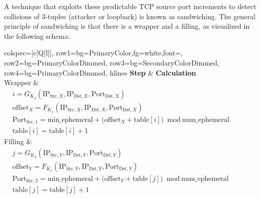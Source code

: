 \documentclass[twocolumn]{report}
\begin{document}
A technique that exploits these predictable TCP source port increments to detect collisions of 3-tuples (attacker or loopback) is known as \alert{sandwiching}. The general principle of sandwiching is that there is a \alert{wrapper} and a \alert{filling}, as visualized in the following schema:

\begin{center}
	\begin{adjustbox}{max width=0.95\columnwidth}
		\begin{tblr}{
			colspec={|c|Q[l]|},
			row{1}={bg=PrimaryColor,fg=white,font=\bfseries},
			row{2}={bg=PrimaryColorDimmed},
			row{3}={bg=SecondaryColorDimmed},
			row{4}={bg=PrimaryColorDimmed},
			hlines
			}
			\textbf{Step} & \textbf{Calculation} \\

			Wrapper       &
			\(
			\begin{aligned}
				 & i = G_{K_2}(\text{IP}_{\text{Src},X}, \text{IP}_{\text{Dst},X}, \text{Port}_{\text{Dst},X})                                   \\
				 & \text{offset}_X = F_{K_1}(\text{IP}_{\text{Src},X}, \text{IP}_{\text{Dst},X}, \text{Port}_{\text{Dst},X})                     \\
				 & \text{Port}_{\text{Src},1} = \text{min\_ephemeral} + \bigl(\text{offset}_X + \text{table}[i]\bigr)\bmod \text{num\_ephemeral} \\
				 & \text{table}[i] = \text{table}[i] + 1
			\end{aligned}
			\)                                   \\

			Filling       &
			\(
			\begin{aligned}
				 & j = G_{K_2}(\text{IP}_{\text{Src},Y}, \text{IP}_{\text{Dst},Y}, \text{Port}_{\text{Dst},Y})                                   \\
				 & \text{offset}_Y = F_{K_1}(\text{IP}_{\text{Src},Y}, \text{IP}_{\text{Dst},Y}, \text{Port}_{\text{Dst},Y})                     \\
				 & \text{Port}_{\text{Src},2} = \text{min\_ephemeral} + \bigl(\text{offset}_Y + \text{table}[j]\bigr)\bmod \text{num\_ephemeral} \\
				 & \text{table}[j] = \text{table}[j] + 1
			\end{aligned}
			\)                                   \\


\end{tblr}
\end{adjustbox}
\end{center}
\end{document}
